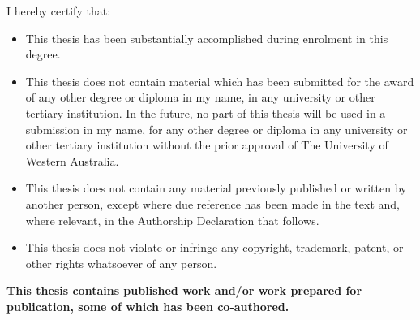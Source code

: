 
\begin{declaration}


I hereby certify that:
\begin{itemize}
	\item This thesis has been substantially accomplished during enrolment in this degree.
	\item This thesis does not contain material which has been submitted for the award of any other degree or diploma in my name, in any university or other tertiary institution.
	In the future, no part of this thesis will be used in a submission in my name, for any other degree or diploma in any university or other tertiary institution without the prior approval of The University of Western Australia.
	\item This thesis does not contain any material previously published or written by another person, except where due reference has been made in the text and, where relevant, in the Authorship Declaration that follows. 
	\item This thesis does not violate or infringe any copyright, trademark, patent, or other rights whatsoever of any person.
\end{itemize}

\textbf{This thesis contains published work and/or work prepared for publication, some of which has been co-authored.}


\end{declaration}

